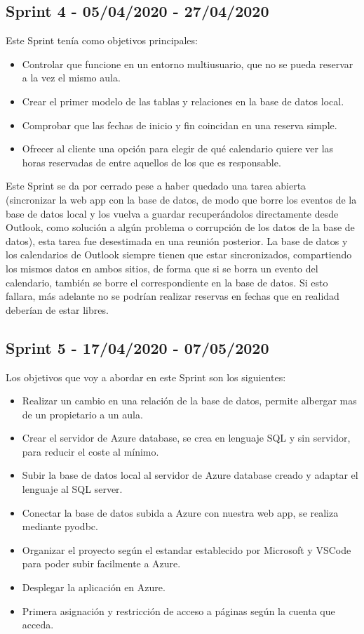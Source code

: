 \subsection{Sprint 4 - 05/04/2020 - 27/04/2020}
Este Sprint tenía como objetivos principales:
\begin{itemize}
    \item Controlar que funcione en un entorno multiusuario, que no se pueda reservar a la vez el mismo aula.
    \item Crear el primer modelo de las tablas y relaciones en la base de datos local.
    \item Comprobar que las fechas de inicio y fin coincidan en una reserva simple.
    \item Ofrecer al cliente una opción para elegir de qué calendario quiere ver las horas reservadas de entre aquellos de los que es responsable.
\end{itemize}
Este Sprint se da por cerrado pese a haber quedado una tarea abierta (sincronizar la web app con la base de datos, de modo que borre los eventos de la base de datos local y los vuelva a guardar recuperándolos directamente desde Outlook, como solución a algún problema o corrupción de los datos de la base de datos), esta tarea fue desestimada en una reunión posterior. La base de datos y los calendarios de Outlook siempre tienen que estar sincronizados, compartiendo los mismos datos en ambos sitios, de forma que si se borra un evento del calendario, también se borre el correspondiente en la base de datos. Si esto fallara, más adelante no se podrían realizar reservas en fechas que en realidad deberían de estar libres.
\subsection{Sprint 5 - 17/04/2020 - 07/05/2020}
Los objetivos que voy a abordar en este Sprint son los siguientes:
\begin{itemize}
    \item Realizar un cambio en una relación de la base de datos, permite albergar mas de un propietario a un aula.
    \item Crear el servidor de Azure database, se crea en lenguaje SQL y sin servidor, para reducir el coste al mínimo.
    \item Subir la base de datos local al servidor de Azure database creado y adaptar el lenguaje al SQL server.
    \item Conectar la base de datos subida a Azure con nuestra web app, se realiza mediante pyodbc.
    \item Organizar el proyecto según el estandar establecido por Microsoft y VSCode para poder subir facilmente a Azure.
    \item Desplegar la aplicación en Azure.
    \item Primera asignación y restricción de acceso a páginas según la cuenta que acceda.
\end{itemize}

